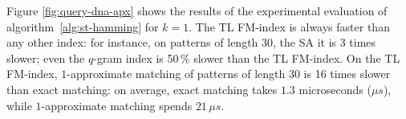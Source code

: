 %

Figure \ref{fig:query-dna-apx} shows the results of the experimental evaluation of algorithm~\ref{alg:st-hamming} for $k=1$.
The TL FM-index is always faster than any other index: for instance, on patterns of length 30, the SA it is 3 times slower; even the $q$-gram index is 50\,\% slower than the TL FM-index.
On the TL FM-index, $1$-approximate matching of patterns of length 30 is 16 times slower than exact matching: on average, exact matching takes $1.3$ microseconds ($\mu s$), while $1$-approximate matching spends $21 \, \mu s$.


